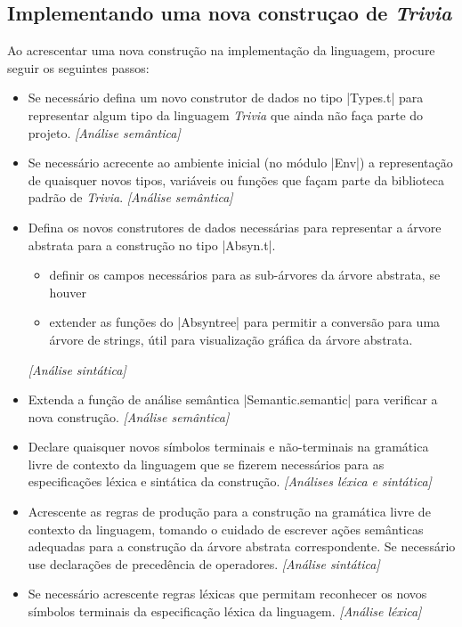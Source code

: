 \documentclass[a4paper,11pt,brazil]{article}
\newcommand{\lang}{\textsl{Trivia}}
\begin{document}
\subsection{Implementando uma nova construçao de \lang{}}

Ao acrescentar uma nova construção na implementação da linguagem,
procure seguir os seguintes passos:
\begin{itemize}
  \item Se necessário defina um novo construtor de dados no tipo
  \pyginline|Types.t| para representar algum tipo da linguagem \lang{}
  que ainda não faça parte do projeto. \textit{[Análise semântica]}

  \item Se necessário acrecente ao ambiente inicial (no módulo
  \pyginline|Env|) a representação de quaisquer novos tipos, variáveis
  ou funções que façam parte da biblioteca padrão de
  \lang{}. \textit{[Análise semântica]}

  \item Defina os novos construtores de dados necessárias para
  representar a árvore abstrata para a construção no tipo
  \pyginline|Absyn.t|.
  \begin{itemize}[noitemsep]
    \item definir os campos necessários para as sub-árvores da árvore
    abstrata, se houver
    \item extender as funções do \pyginline|Absyntree| para permitir a
    conversão para uma árvore de strings, útil para visualização
    gráfica da árvore abstrata.
  \end{itemize}
  \textit{[Análise sintática]}

  \item Extenda a função de análise semântica
  \pyginline|Semantic.semantic| para verificar a nova
  construção. \textit{[Análise semântica]}

  \item Declare quaisquer novos símbolos terminais e não-terminais na
  gramática livre de contexto da linguagem que se fizerem necessários
  para as especificações léxica e sintática da
  construção. \textit{[Análises léxica e sintática]}

  \item Acrescente as regras de produção para a construção na
  gramática livre de contexto da linguagem, tomando o cuidado de
  escrever ações semânticas adequadas para a construção da árvore
  abstrata correspondente. Se necessário use declarações de
  precedência de operadores. \textit{[Análise sintática]}

  \item Se necessário acrescente regras léxicas que permitam
  reconhecer os novos símbolos terminais da especificação léxica da
  linguagem. \textit{[Análise léxica]}
\end{itemize}
\end{document}
